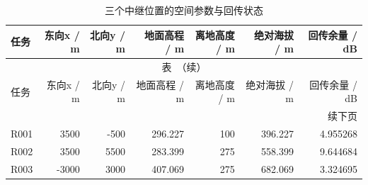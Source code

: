 \begingroup
\small
\setlength{\tabcolsep}{3pt}
\renewcommand{\arraystretch}{1.10}
\begin{longtable}{@{}lrrrrrr@{}}
\caption{三个中继位置的空间参数与回传状态}\label{tab:q3-relay-geometry}\\
\toprule
任务 & 东向x / m & 北向y / m & 地面高程 / m & 离地高度 / m & 绝对海拔 / m & 回传余量 / dB \\
\midrule
\endfirsthead
\multicolumn{7}{c}{\small 表~\thetable{}（续）}\\
\toprule
任务 & 东向x / m & 北向y / m & 地面高程 / m & 离地高度 / m & 绝对海拔 / m & 回传余量 / dB \\
\midrule
\endhead
\midrule
\multicolumn{7}{r}{\small 续下页}\\
\endfoot
\bottomrule
\endlastfoot
R001 & 3500 & -500 & 296.227 & 100 & 396.227 & 4.955268 \\
R002 & 3500 & 5500 & 283.399 & 275 & 558.399 & 9.644684 \\
R003 & -3000 & 3000 & 407.069 & 275 & 682.069 & 3.324695 \\
\end{longtable}
\endgroup
